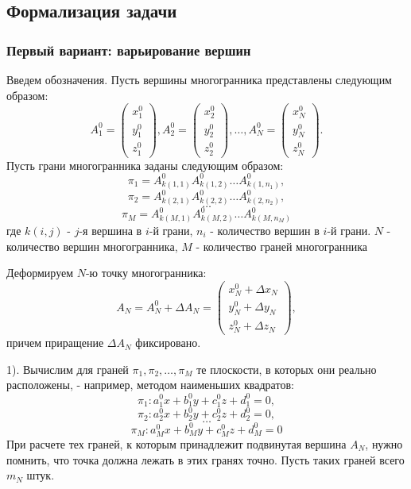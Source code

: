 \documentclass[a4paper,12pt, titlepage]{article}
\begin{document}
\subsection{Формализация задачи}
\subsubsection{Первый вариант: варьирование вершин}
	\begin{flushleft}
		Введем обозначения. Пусть вершины многогранника представлены следующим образом:
		$$
		  A^{0}_{1} = \begin{pmatrix}x^{0}_{1}\\y^{0}_{1}\\z^{0}_{1}\end{pmatrix},
		  A^{0}_{2} = \begin{pmatrix}x^{0}_{2}\\y^{0}_{2}\\z^{0}_{2}\end{pmatrix},
		  \ldots, 
		  A^{0}_{N} = \begin{pmatrix}x^{0}_{N}\\y^{0}_{N}\\z^{0}_{N}\end{pmatrix}.
		$$
		Пусть грани многогранника заданы следующим образом:
		$$\pi_{1} = A^{0}_{k(1, 1)} A^{0}_{k(1, 2)} \ldots A^{0}_{k(1, n_{1})},$$
		$$\pi_{2} = A^{0}_{k(2, 1)} A^{0}_{k(2, 2)} \ldots A^{0}_{k(2, n_{2})},$$
		$$\ldots$$
		$$\pi_{M} = A^{0}_{k(M, 1)} A^{0}_{k(M, 2)} \ldots A^{0}_{k(M, n_{M})}$$
		где $k(i, j)$ - $j$-я вершина в $i$-й грани, $n_{i}$ - количество вершин
		в $i$-й грани. $N$ - количество вершин многогранника, $M$ - количество граней
		многогранника
	\end{flushleft}
	\begin{flushleft}
		Деформируем $N$-ю точку многогранника: 
		$$
		  A_{N} = A^{0}_{N} + \Delta A_{N} = 
		  \begin{pmatrix}
				 x^{0}_{N} + \Delta x_{N}\\
				 y^{0}_{N} + \Delta y_{N}\\
				 z^{0}_{N} + \Delta z_{N}
		  \end{pmatrix},
		$$
		причем приращение $\Delta A_{N}$ фиксировано.
	\end{flushleft}
	\begin{flushleft}
		1). Вычислим для граней $\pi_{1}, \pi_{2}, \ldots, \pi_{M}$ те плоскости, в которых они
		реально расположены, - например, методом наименьших квадратов:
		$$\pi_{1} : a^{0}_{1} x + b^{0}_{1} y + c^{0}_{1} z + d^{0}_{1} = 0,$$
		$$\pi_{2} : a^{0}_{2} x + b^{0}_{2} y + c^{0}_{2} z + d^{0}_{2} = 0,$$
		$$\ldots$$
		$$\pi_{M} : a^{0}_{M} x + b^{0}_{M} y + c^{0}_{M} z + d^{0}_{M} = 0$$
		При расчете тех граней, к которым принадлежит подвинутая вершина $A_{N}$, нужно
		помнить, что точка должна лежать в этих гранях точно. Пусть таких граней всего $m_{N}$ 
		штук.
	\end{flushleft}
\end{document}
